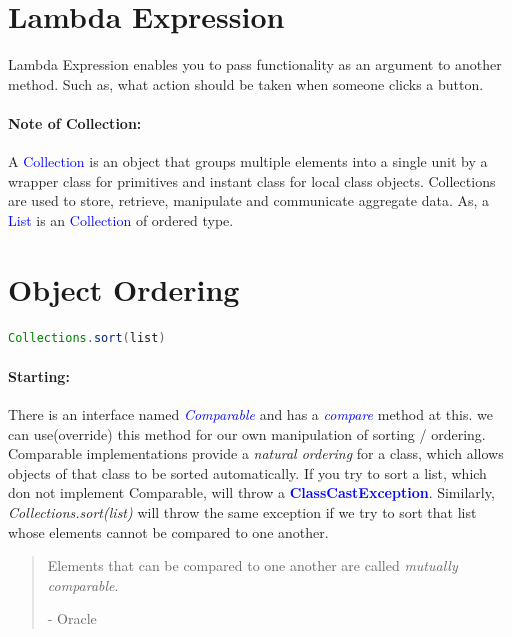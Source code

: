 \section{Lambda Expression}
Lambda Expression enables you to pass functionality as an argument to another method. Such as, what action should be taken when someone clicks a button.
\paragraph{Note of Collection:}A \textcolor{blue}{Collection} is an object that groups multiple elements into a single unit by a wrapper class for primitives and instant class for local class objects. Collections are used to store, retrieve, manipulate and communicate aggregate data. As, a \textcolor{blue}{List} is an \textcolor{blue}{Collection} of ordered type.

\section{Object Ordering}
\begin{framed}
	\begin{lstlisting}[language = java]
		Collections.sort(list)
	\end{lstlisting}
\end{framed}
\paragraph{Starting:}
\begin{multicols}{2}
There is an interface named \textit{\textcolor{blue}{Comparable}} and has a \textit{\textcolor{blue}{compare}} method at this. we can use(override) this method for our own manipulation of sorting / ordering. \textsf{Comparable} implementations provide a \textit{natural ordering} for a class, which allows objects of that class to be sorted automatically.\linebreak
If you try to sort a list, which don not implement Comparable, will throw a \textbf{\textcolor{blue}{ClassCastException}}. Similarly, \textit{Collections.sort(list)} will throw the same exception if we try to sort that list whose elements cannot be compared to one another.
\end{multicols}
\begin{quotation}
	Elements that can be compared to one another are called \textit{mutually comparable}.
	\begin{flushright}
		- Oracle
	\end{flushright}
\end{quotation}

